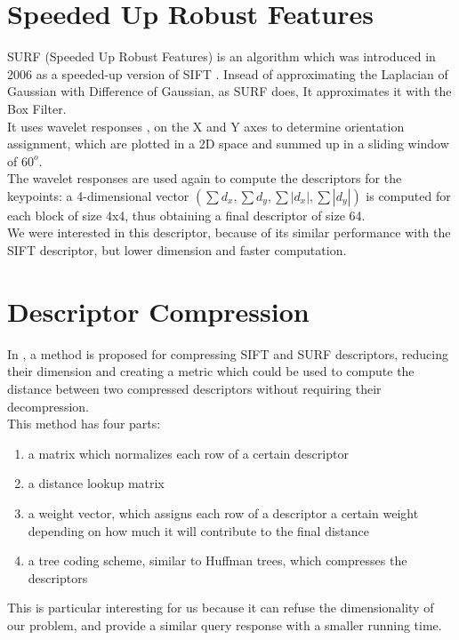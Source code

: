 \section{Speeded Up Robust Features}

SURF (Speeded Up Robust Features) is an algorithm which was introduced in 2006 as a speeded-up version of SIFT \cite{surf}. Insead of approximating the Laplacian of Gaussian with Difference of Gaussian, as SURF does, It approximates it with the Box Filter.\\
It uses wavelet responses \cite{haarWavelet}, \cite{haarWavelet2} on the X and Y axes to determine orientation assignment, which are plotted in a 2D space and summed up in a sliding window of $60^o$.\\
The wavelet responses are used again to compute the descriptors for the keypoints: a 4-dimensional vector $(\sum{d_x}, \sum{d_y}, \sum{|d_x|}, \sum{|d_y|})$ is computed for each block of size 4x4, thus obtaining a final descriptor of size 64.\\
We were interested in this descriptor, because of its similar performance with the SIFT descriptor, but lower dimension and faster computation.\\

\section{Descriptor Compression}

In \cite{descCompression}, a method is proposed for compressing SIFT and SURF descriptors, reducing their dimension and creating a metric which could be used to compute the distance between two compressed descriptors without requiring their decompression.\\
This method has four parts:
\begin{enumerate}
	\item a matrix which normalizes each row of a certain descriptor
	\item a distance lookup matrix 
	\item a weight vector, which assigns each row of a descriptor a certain weight depending on how much it will contribute to the final distance
	\item a tree coding scheme, similar to Huffman trees, which compresses the descriptors
\end{enumerate}

This is particular interesting for us because it can refuse the dimensionality of our problem, and provide a similar query response with a smaller running time.
